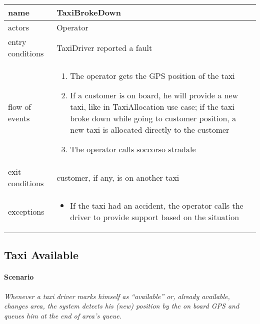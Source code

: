 	\begin{fullwidth}
		\begin{tabular}{ p{} p{} }
	\toprule
	name	&	TaxiBrokeDown
	\\ \midrule
	actors	&	Operator
	\\ \midrule
	entry conditions & TaxiDriver reported a fault
	\\ \midrule
	flow of events & \begin{enumerate}
	
		\item The operator gets the GPS position of the taxi
		\item If a customer is on board, he will provide a new taxi, like in TaxiAllocation use case; if the taxi broke down while going to customer position, a new taxi is allocated directly to the customer
		\item The operator calls soccorso stradale
	
	\end{enumerate}\\ \midrule
	exit conditions	&	 customer, if any, is on another taxi
		\\ \midrule
	exceptions & \begin{itemize}
		
		\item If the taxi had an accident, the operator calls the driver to provide support based on the situation
	
	\end{itemize}\\ \bottomrule
\end{tabular}
	\end{fullwidth}


\subsection{Taxi Available}
\paragraph{Scenario}\begin{fullwidth}\small\itshape Whenever a taxi driver marks himself as “available'' or, already available, changes area, the system detects his (new) position by the on board GPS and queues him at the end of area’s queue.\end{fullwidth}


